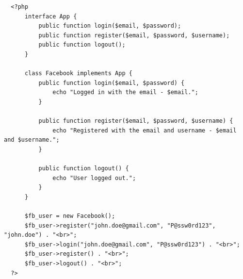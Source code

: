 \documentclass{article}
\begin{document}
\begin{verbatim}
  <?php
      interface App {
          public function login($email, $password);
          public function register($email, $password, $username); 
          public function logout(); 
      }

      class Facebook implements App {
          public function login($email, $password) {
              echo "Logged in with the email - $email.";
          }

          public function register($email, $password, $username) {
              echo "Registered with the email and username - $email and $username.";
          }

          public function logout() {
              echo "User logged out.";
          }
      }

      $fb_user = new Facebook();
      $fb_user->register("john.doe@gmail.com", "P@ssw0rd123", "john.doe") . "<br>";
      $fb_user->login("john.doe@gmail.com", "P@ssw0rd123") . "<br>";
      $fb_user->register() . "<br>";
      $fb_user->logout() . "<br>";
  ?>
\end{verbatim}
\end{document}
